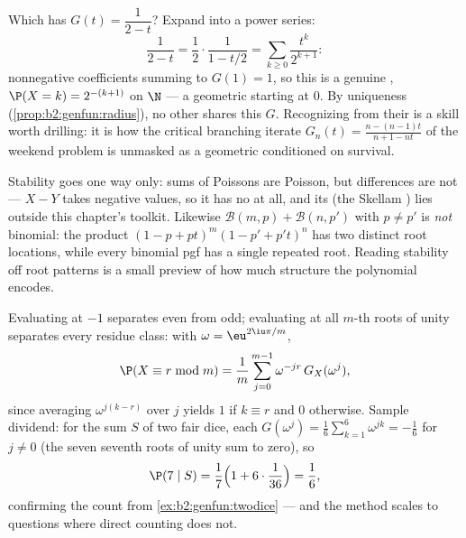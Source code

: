 \begin{example}\label{ex:b2:genfun:identify}
Which  has $G(t) = \dfrac1{2 - t}$? Expand into a power
series:
\[
\frac{1}{2 - t} = \frac12\cdot\frac1{1 - t/2}
= \sum_{k\geq0}\frac{t^k}{2^{k+1}} :
\]
nonnegative coefficients summing to $G(1) = 1$, so this is a
genuine , $\P(X = k) = 2^{-(k+1)}$ on $\N$ --- a
geometric  starting at $0$. By uniqueness
(\cref{prop:b2:genfun:radius}), no other  shares this
$G$. Recognizing  from their  is a
skill worth drilling: it is how the critical branching
iterate $G_n(t) = \frac{n - (n-1)t}{n+1 - nt}$ of the
weekend problem is unmasked as a geometric  conditioned
on survival.
\end{example}

\begin{remark}
Stability goes one way only: sums of  Poissons are
Poisson, but differences are not --- $X - Y$ takes negative
values, so it has no  at all, and its 
(the Skellam ) lies outside this chapter's
toolkit. Likewise $\mathcal B(m, p) + \mathcal B(n, p')$ with
$p \neq p'$ is \emph{not} binomial: the product $(1 - p +
pt)^m(1 - p' + p't)^n$ has two distinct root locations, while
every binomial pgf has a single repeated root. Reading
stability off root patterns is a small preview of how much
structure the polynomial encodes.
\end{remark}

\begin{remark}
Evaluating at $-1$ separates even from odd; evaluating at all
$m$-th roots of unity separates every residue class: with
$\omega = \eu^{2\iu\pi/m}$,
\[
\P(X \equiv r \bmod m)
= \frac1m\sum_{j=0}^{m-1}\omega^{-jr}\,G_X(\omega^j),
\]
since averaging $\omega^{j(k-r)}$ over $j$ yields $1$ if $k
\equiv r$ and $0$ otherwise. Sample dividend: for the sum $S$
of two fair dice, each $G(\omega^j) = \frac16\sum_{k=1}^6
\omega^{jk} = -\frac16$ for $j \neq 0$ (the seven seventh
roots of unity sum to zero), so
\[
\P(7 \mid S) = \frac17\Bigl(1 +
6\cdot\frac1{36}\Bigr) = \frac16 ,
\]
confirming the count from \cref{ex:b2:genfun:twodice} ---
and the method scales to questions where direct counting
does not.
\end{remark}

